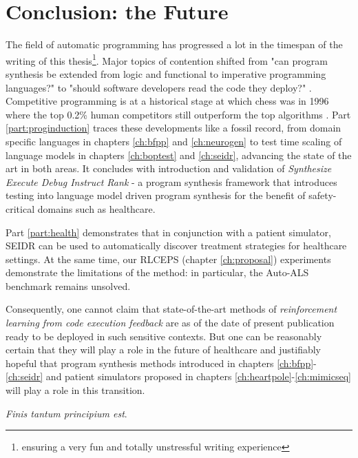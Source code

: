 \chapter{Conclusion: the Future}
\label{ch:conclusion}

The field of automatic programming has progressed a lot in the timespan of the writing of this thesis\footnote{ensuring a very fun and totally unstressful writing experience}.
Major topics of contention shifted from "can program synthesis be extended from logic and functional to imperative programming languages?" \cite{polikarpovaStructuringSynthesisHeapmanipulating2019} to "should software developers read the code they deploy?" \cite{andrejkarpathy[@karpathy]TheresNewKind2025}.
Competitive programming is at a historical stage at which chess was in 1996 \cite{pandolfiniKasparovDeepBlue1997} where the top 0.2\% human competitors still outperform the top algorithms \cite{openaiCompetitiveProgrammingLarge2025}.
Part \ref{part:proginduction} traces these developments like a fossil record, from domain specific languages in chapters \ref{ch:bfpp} and \ref{ch:neurogen} to test time scaling of language models in chapters \ref{ch:boptest} and \ref{ch:seidr}, advancing the state of the art in both areas.
It concludes with introduction and validation of \emph{Synthesize Execute Debug Instruct Rank} - a program synthesis framework that introduces testing into language model driven program synthesis for the benefit of safety-critical domains such as healthcare.

Part \ref{part:health} demonstrates that in conjunction with a patient simulator, SEIDR can be used to automatically discover treatment strategies for healthcare settings.
At the same time, our RLCEPS (chapter \ref{ch:proposal}) experiments demonstrate the limitations of the method: in particular, the Auto-ALS benchmark remains unsolved.

Consequently, one cannot claim that state-of-the-art methods of \emph{reinforcement learning from code execution feedback} are as of the date of present publication ready to be deployed in such sensitive contexts.
But one can be reasonably certain that they will play a role in the future of healthcare and justifiably hopeful that program synthesis methods introduced in chapters \ref{ch:bfpp}-\ref{ch:seidr} and patient simulators proposed in chapters \ref{ch:heartpole}-\ref{ch:mimicseq} will play a role in this transition.

\emph{Finis tantum principium est}.